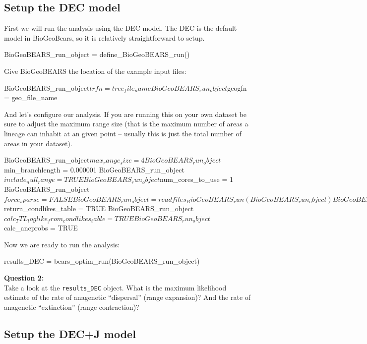 \documentclass[11pt]{article}
\begin{document}
\subsection{Setup the DEC model}

First we will run the analysis using the DEC model.
The DEC is the default model in BioGeoBears, so
it is relatively straightforward to setup.
\begin{code}
BioGeoBEARS_run_object = define_BioGeoBEARS_run()
\end{code}
Give BioGeoBEARS the location of the example input files:
\begin{code}
BioGeoBEARS_run_object$trfn = tree_file_name
BioGeoBEARS_run_object$geogfn = geo_file_name
\end{code}
And let's configure our analysis.
If you are running this on your own dataset be sure
to adjust the maximum range size (that is the maximum
number of areas a lineage can inhabit at an given point
-- usually this is just the total number of areas in your dataset).
\begin{code}
BioGeoBEARS_run_object$max_range_size = 4
BioGeoBEARS_run_object$min_branchlength = 0.000001 
BioGeoBEARS_run_object$include_null_range = TRUE
BioGeoBEARS_run_object$num_cores_to_use = 1
BioGeoBEARS_run_object$force_sparse = FALSE 
BioGeoBEARS_run_object = readfiles_BioGeoBEARS_run(BioGeoBEARS_run_object)
BioGeoBEARS_run_object$return_condlikes_table = TRUE
BioGeoBEARS_run_object$calc_TTL_loglike_from_condlikes_table = TRUE
BioGeoBEARS_run_object$calc_ancprobs = TRUE 
\end{code}
Now we are ready to run the analysis:
\begin{code}
results_DEC = bears_optim_run(BioGeoBEARS_run_object)
\end{code}

\begin{framed}
\noindent
\textbf{Question 2:} \\
Take a look at the \texttt{results\_DEC}
object. What is the maximum likelihood estimate
of the rate of anagenetic ``dispersal'' (range expansion)?
And the rate of anagenetic ``extinction'' (range contraction)?
\end{framed}


\subsection{Setup the DEC+J model}
\end{document}
